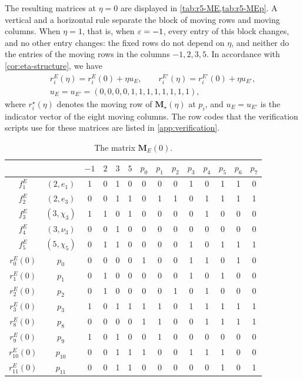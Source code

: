The resulting matrices at $\eta=0$ are displayed in \cref{tab:r5-ME,tab:r5-MEp}. A vertical and a horizontal rule separate the block of moving rows and moving columns. When $\eta=1$, that is, when $\varepsilon=-1$, every entry of this block changes, and no other entry changes: the fixed rows do not depend on $\eta$, and neither do the entries of the moving rows in the columns $-1,2,3,5$. In accordance with \cref{cor:eta-structure}, we have
\begin{equation}\label{r5:eta}
\begin{gathered}
r^E_i(\eta)=r^E_i(0)+\eta u_E,\qquad r^{E'}_i(\eta)=r^{E'}_i(0)+\eta u_{E'},\\
u_E=u_{E'}=(0,0,0,0,1,1,1,1,1,1,1,1),
\end{gathered}
\end{equation}
where $r^\star_i(\eta)$ denotes the moving row of $\mathbf M_\star(\eta)$ at $p_i$, and $u_E=u_{E'}$ is the indicator vector of the eight moving columns. The row codes that the verification scripts use for these matrices are listed in \cref{app:verification}.

\begin{table}[htbp]
\centering
\caption{The matrix $\mathbf M_E(0)$.}\label{tab:r5-ME}
\begin{tabular}{cc|cccc|cccccccc}
& & $-1$ & $2$ & $3$ & $5$ & $p_0$ & $p_1$ & $p_2$ & $p_3$ & $p_4$ & $p_5$ & $p_6$ & $p_7$\\
\hline
$f^{E}_1$ & $(2,e_1)$ & 1 & 0 & 1 & 0 & 0 & 0 & 0 & 1 & 0 & 1 & 1 & 0 \\
$f^{E}_2$ & $(2,e_3)$ & 0 & 0 & 1 & 1 & 0 & 1 & 1 & 0 & 1 & 1 & 1 & 1 \\
$f^{E}_3$ & $(3,\chi_3)$ & 1 & 1 & 0 & 1 & 0 & 0 & 0 & 0 & 1 & 0 & 0 & 0 \\
$f^{E}_4$ & $(3,\nu_3)$ & 0 & 0 & 1 & 0 & 0 & 0 & 0 & 0 & 0 & 0 & 0 & 0 \\
$f^{E}_5$ & $(5,\chi_5)$ & 0 & 1 & 1 & 0 & 0 & 0 & 0 & 1 & 0 & 1 & 1 & 1 \\
\hline
$r^{E}_0(0)$ & $p_0$ & 0 & 0 & 0 & 0 & 1 & 0 & 0 & 1 & 1 & 0 & 1 & 0 \\
$r^{E}_1(0)$ & $p_1$ & 0 & 1 & 0 & 0 & 0 & 0 & 0 & 1 & 0 & 1 & 0 & 0 \\
$r^{E}_2(0)$ & $p_2$ & 0 & 1 & 0 & 0 & 0 & 0 & 1 & 0 & 1 & 0 & 0 & 0 \\
$r^{E}_3(0)$ & $p_3$ & 1 & 0 & 1 & 1 & 1 & 1 & 0 & 1 & 1 & 1 & 1 & 1 \\
$r^{E}_8(0)$ & $p_8$ & 0 & 0 & 0 & 0 & 1 & 1 & 0 & 0 & 1 & 1 & 1 & 1 \\
$r^{E}_9(0)$ & $p_9$ & 1 & 0 & 1 & 0 & 0 & 1 & 0 & 0 & 0 & 0 & 0 & 0 \\
$r^{E}_{10}(0)$ & $p_{10}$ & 0 & 0 & 1 & 1 & 1 & 0 & 0 & 1 & 1 & 1 & 0 & 0 \\
$r^{E}_{11}(0)$ & $p_{11}$ & 0 & 0 & 1 & 1 & 0 & 0 & 0 & 0 & 0 & 1 & 0 & 1 \\
\end{tabular}
\end{table}

